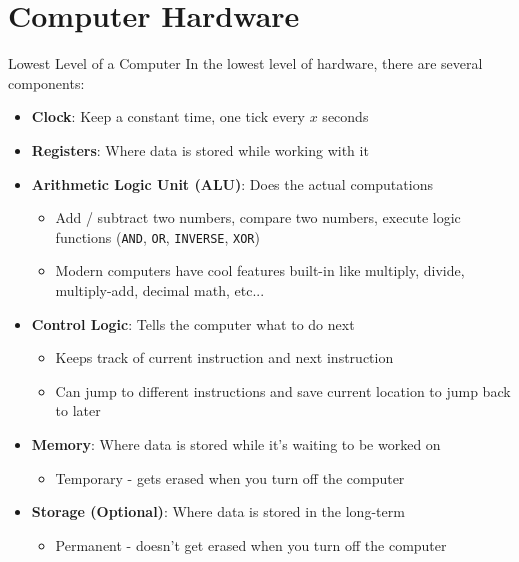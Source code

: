 \documentclass[aspectratio=169]{beamer}
\begin{document}
\section{Computer Hardware}

\begin{frame}{Lowest Level of a Computer}
    In the lowest level of hardware, there are several components:

    \begin{itemize}
        \item \textbf{Clock}: Keep a constant time, one tick every $x$ seconds
        \item \textbf{Registers}: Where data is stored while working with it
        \item \textbf{Arithmetic Logic Unit (ALU)}: Does the actual computations
              \begin{itemize}
                  \item Add / subtract two numbers, compare two numbers, execute logic functions (\texttt{AND}, \texttt{OR}, \texttt{INVERSE}, \texttt{XOR})
                  \item Modern computers have cool features built-in like multiply, divide, multiply-add, decimal math, etc...
              \end{itemize}
        \item \textbf{Control Logic}: Tells the computer what to do next
              \begin{itemize}
                  \item Keeps track of current instruction and next instruction
                  \item Can jump to different instructions and save current location to jump back to later
              \end{itemize}
        \item \textbf{Memory}: Where data is stored while it's waiting to be worked on
              \begin{itemize}
                  \item Temporary - gets erased when you turn off the computer
              \end{itemize}
        \item \textbf{Storage (Optional)}: Where data is stored in the long-term
              \begin{itemize}
                  \item Permanent - doesn't get erased when you turn off the computer
              \end{itemize}
    \end{itemize}

\end{frame}
\end{document}
